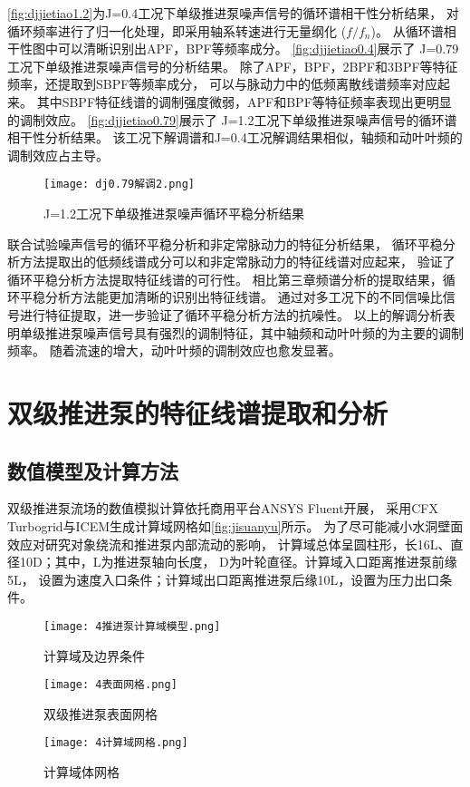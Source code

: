 \autoref{fig:djjietiao1.2}为J=0.4工况下单级推进泵噪声信号的循环谱相干性分析结果，
对循环频率进行了归一化处理，即采用轴系转速进行无量纲化 ($f/f_n$)。
从循环谱相干性图中可以清晰识别出APF，BPF等频率成分。
\autoref{fig:djjietiao0.4}展示了 J=0.79工况下单级推进泵噪声信号的分析结果。
除了APF，BPF，2BPF和3BPF等特征频率，还提取到SBPF等频率成分，
可以与脉动力中的低频离散线谱频率对应起来。
其中SBPF特征线谱的调制强度微弱，APF和BPF等特征频率表现出更明显的调制效应。
\autoref{fig:djjietiao0.79}展示了 J=1.2工况下单级推进泵噪声信号的循环谱相干性分析结果。
该工况下解调谱和J=0.4工况解调结果相似，轴频和动叶叶频的调制效应占主导。


\begin{figure}[htbp]
    \centering
    \texttt{[image: dj0.79解调2.png]}
    \caption{\label{fig:djjietiao0.79}J=1.2工况下单级推进泵噪声循环平稳分析结果}
\end{figure}

联合试验噪声信号的循环平稳分析和非定常脉动力的特征分析结果，
循环平稳分析方法提取出的低频线谱成分可以和非定常脉动力的特征线谱对应起来，
验证了循环平稳分析方法提取特征线谱的可行性。
相比第三章频谱分析的提取结果，循环平稳分析方法能更加清晰的识别出特征线谱。
通过对多工况下的不同信噪比信号进行特征提取，进一步验证了循环平稳分析方法的抗噪性。
以上的解调分析表明单级推进泵噪声信号具有强烈的调制特征，其中轴频和动叶叶频的为主要的调制频率。
随着流速的增大，动叶叶频的调制效应也愈发显著。

\section{双级推进泵的特征线谱提取和分析}
\subsection{数值模型及计算方法}
双级推进泵流场的数值模拟计算依托商用平台ANSYS Fluent开展，
采用CFX Turbogrid与ICEM生成计算域网格如\autoref{fig:jisuanyu}所示。
为了尽可能减小水洞壁面效应对研究对象绕流和推进泵内部流动的影响，
计算域总体呈圆柱形，长16L、直径10D；其中，L为推进泵轴向长度，
D为叶轮直径。计算域入口距离推进泵前缘5L，
设置为速度入口条件；计算域出口距离推进泵后缘10L，设置为压力出口条件。
\begin{figure}[htbp]
    \centering
    \texttt{[image: 4推进泵计算域模型.png]}
    \caption{\label{fig:jisuanyu}计算域及边界条件}
\end{figure}
\begin{figure}[htbp]
    \centering
    \texttt{[image: 4表面网格.png]}
    \caption{\label{fig:sjwangge}双级推进泵表面网格}
\end{figure}
\begin{figure}[htbp]
    \centering
    \texttt{[image: 4计算域网格.png]}
    \caption{\label{fig:jisuanyuwangge}计算域体网格}
\end{figure}

